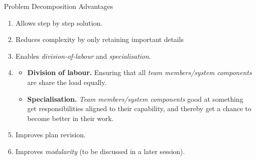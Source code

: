 \documentclass{beamer}
\begin{document}
\begin{frame}[fragile]{Problem Decomposition}
{Advantages}

\begin{enumerate}
\item Allows step by step solution.
\item Reduces complexity by only retaining important details
\item Enables \emph{division-of-labour} and \emph{specialisation}.
\item
\begin{scriptsize}
\begin{itemize}
\item \textbf{Division of labour.} Ensuring that all \emph{team members/system components} are share the load equally.
\item \textbf{Specialisation.} \emph{Team members/system components} good at something get responsibilities aligned to their capability, and thereby get a chance to become better in their work.
\end{itemize}
\end{scriptsize}
\item Improves plan revision.
\item Improves \emph{modularity} (to be discussed in a later session).
\end{enumerate}
\end{frame}
\end{document}
